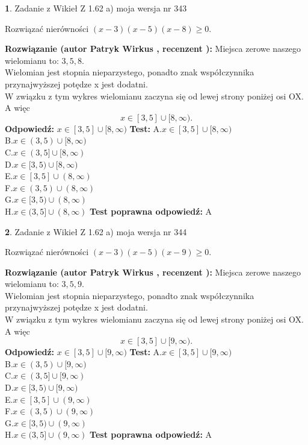 \documentclass[12pt, a4paper]{article}
\theoremstyle{definition} %
\newtheorem{zad}{}
\newcommand{\zadStart}[1]{\begin{zad}#1\newline}
\newcommand{\zadStop}{\end{zad}}
\newcommand{\rozwStart}[2]{\noindent \textbf{Rozwiązanie (autor #1 , recenzent #2): }\newline}
\newcommand{\rozwStop}{\newline}
\newcommand{\odpStart}{\noindent \textbf{Odpowiedź:}\newline}
\newcommand{\odpStop}{\newline}
\newcommand{\testStart}{\noindent \textbf{Test:}\newline}
\newcommand{\testStop}{\newline}
\newcommand{\kluczStart}{\noindent \textbf{Test poprawna odpowiedź:}\newline}
\newcommand{\kluczStop}{\newline}
\begin{document}
\zadStart{Zadanie z Wikieł Z 1.62 a) moja wersja nr 343}

Rozwiązać nierówności $(x-3)(x-5)(x-8)\ge0$.
\zadStop
\rozwStart{Patryk Wirkus}{}
Miejsca zerowe naszego wielomianu to: $3, 5, 8$.\\
Wielomian jest stopnia nieparzystego, ponadto znak współczynnika przy\linebreak najwyższej potędze x jest dodatni.\\ W związku z tym wykres wielomianu zaczyna się od lewej strony poniżej osi OX. A więc $$x \in [3,5] \cup [8,\infty).$$
\rozwStop
\odpStart
$x \in [3,5] \cup [8,\infty)$
\odpStop
\testStart
A.$x \in [3,5] \cup [8,\infty)$\\
B.$x \in (3,5) \cup [8,\infty)$\\
C.$x \in (3,5] \cup [8,\infty)$\\
D.$x \in [3,5) \cup [8,\infty)$\\
E.$x \in [3,5] \cup (8,\infty)$\\
F.$x \in (3,5) \cup (8,\infty)$\\
G.$x \in [3,5) \cup (8,\infty)$\\
H.$x \in (3,5] \cup (8,\infty)$
\testStop
\kluczStart
A
\kluczStop



\zadStart{Zadanie z Wikieł Z 1.62 a) moja wersja nr 344}

Rozwiązać nierówności $(x-3)(x-5)(x-9)\ge0$.
\zadStop
\rozwStart{Patryk Wirkus}{}
Miejsca zerowe naszego wielomianu to: $3, 5, 9$.\\
Wielomian jest stopnia nieparzystego, ponadto znak współczynnika przy\linebreak najwyższej potędze x jest dodatni.\\ W związku z tym wykres wielomianu zaczyna się od lewej strony poniżej osi OX. A więc $$x \in [3,5] \cup [9,\infty).$$
\rozwStop
\odpStart
$x \in [3,5] \cup [9,\infty)$
\odpStop
\testStart
A.$x \in [3,5] \cup [9,\infty)$\\
B.$x \in (3,5) \cup [9,\infty)$\\
C.$x \in (3,5] \cup [9,\infty)$\\
D.$x \in [3,5) \cup [9,\infty)$\\
E.$x \in [3,5] \cup (9,\infty)$\\
F.$x \in (3,5) \cup (9,\infty)$\\
G.$x \in [3,5) \cup (9,\infty)$\\
H.$x \in (3,5] \cup (9,\infty)$
\testStop
\kluczStart
A
\kluczStop
\end{document}

